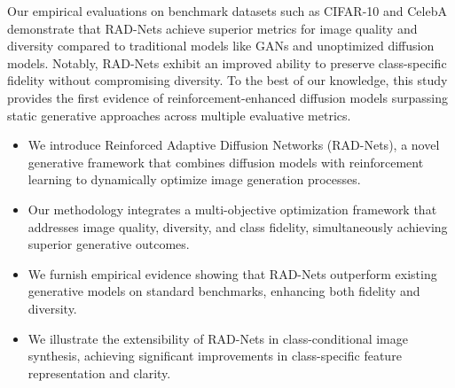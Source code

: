Our empirical evaluations on benchmark datasets such as CIFAR-10 and CelebA demonstrate that RAD-Nets achieve superior metrics for image quality and diversity compared to traditional models like GANs and unoptimized diffusion models. Notably, RAD-Nets exhibit an improved ability to preserve class-specific fidelity without compromising diversity. To the best of our knowledge, this study provides the first evidence of reinforcement-enhanced diffusion models surpassing static generative approaches across multiple evaluative metrics.

\begin{itemize}
    \item We introduce Reinforced Adaptive Diffusion Networks (RAD-Nets), a novel generative framework that combines diffusion models with reinforcement learning to dynamically optimize image generation processes.
    \item Our methodology integrates a multi-objective optimization framework that addresses image quality, diversity, and class fidelity, simultaneously achieving superior generative outcomes.
    \item We furnish empirical evidence showing that RAD-Nets outperform existing generative models on standard benchmarks, enhancing both fidelity and diversity.
    \item We illustrate the extensibility of RAD-Nets in class-conditional image synthesis, achieving significant improvements in class-specific feature representation and clarity.
\end{itemize}
